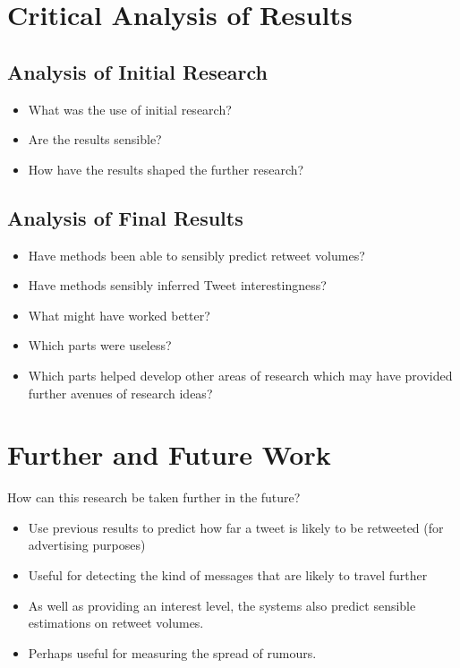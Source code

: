 \section{Critical Analysis of Results}
\subsection{Analysis of Initial Research}
\begin{itemize}
\item What was the use of initial research?
\item Are the results sensible?
\item How have the results shaped the further research?
\end{itemize}

\subsection{Analysis of Final Results}
\begin{itemize}
\item Have methods been able to sensibly predict retweet volumes?
\item Have methods sensibly inferred Tweet interestingness?
\item What might have worked better?
\item Which parts were useless?
\item Which parts helped develop other areas of research which may have provided further avenues of research ideas?
\end{itemize}


\section{Further and Future Work}
How can this research be taken further in the future?

\begin{itemize}
\item Use previous results to predict how far a tweet is likely to be retweeted (for advertising purposes)
\item Useful for detecting the kind of messages that are likely to travel further
\item As well as providing an interest level, the systems also predict sensible estimations on retweet volumes.
\item Perhaps useful for measuring the spread of rumours.
\end{itemize}


